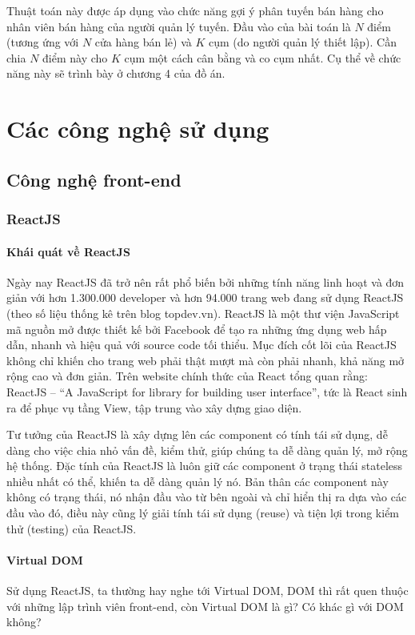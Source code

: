 Thuật toán này được áp dụng vào chức năng gợi ý phân tuyến
bán hàng cho nhân viên bán hàng của người quản lý tuyến.
Đầu vào của bài toán là $N$ điểm (tương ứng với $N$ cửa hàng bán lẻ)
và $K$ cụm (do người quản lý thiết lập). Cần chia $N$ điểm
này cho $K$ cụm một cách cân bằng và co cụm nhất.
Cụ thể về chức năng này sẽ trình bày ở chương 4 của đồ án.

\section{Các công nghệ sử dụng}
\subsection{Công nghệ front-end}
\subsubsection{ReactJS}
\paragraph{Khái quát về ReactJS}

Ngày nay ReactJS đã trở nên rất phổ biến bởi những tính năng
linh hoạt và đơn giản với hơn 1.300.000 developer và hơn 94.000
trang web đang sử dụng ReactJS
(theo số liệu thống kê trên blog topdev.vn). 
ReactJS là một thư viện JavaScript mã nguồn mở được thiết kế
bởi Facebook để tạo ra những ứng dụng web hấp dẫn, nhanh và
hiệu quả với source code tối thiểu. Mục đích cốt lõi của
ReactJS không chỉ khiến cho trang web phải thật mượt mà còn
phải nhanh, khả năng mở rộng cao và đơn giản. Trên website chính
thức của React tổng quan rằng: ReactJS –
“A JavaScript for library for building user interface”,
tức là React sinh ra để phục vụ tầng View,
tập trung vào xây dựng giao diện. 

Tư tưởng của ReactJS là xây dựng lên các component có
tính tái sử dụng, dễ dàng cho việc chia nhỏ vấn đề, kiểm thử,
giúp chúng ta dễ dàng quản lý, mở rộng hệ thống. Đặc tính của
ReactJS là luôn giữ các component ở trạng thái stateless nhiều
nhất có thể, khiến ta dễ dàng quản lý nó. Bản thân các component
này không có trạng thái, nó nhận đầu vào từ bên ngoài và
chỉ hiển thị ra dựa vào các đầu vào đó, điều này
cũng lý giải tính tái sử dụng (reuse) và tiện lợi
trong kiểm thử (testing) của ReactJS.

\paragraph{Virtual DOM}
Sử dụng ReactJS, ta thường hay nghe tới Virtual DOM,
DOM thì rất quen thuộc với những lập trình viên front-end,
còn Virtual DOM là gì? Có khác gì với DOM không? 

